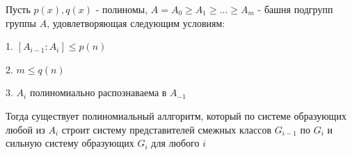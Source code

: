 \begin{theorem}
    Пусть $p(x), q(x)$ - полиномы, $A = A_0 \geqslant A_1 \geqslant ... \geqslant A_m$ - башня подгрупп группы $A$, удовлетворяющая следующим условиям:

    1. $[A_{i-1}:A_i] \leqslant p(n)$

    2. $m \leqslant q(n)$ 

    3. $A_i$ полиномиально распознаваема в $A_{-1}$

    Тогда существует полиномиальный аллгоритм, который по системе образующих любой из $A_i$ строит систему представителей смежных классов $G_{i-1}$ по $G_i$ и сильную систему образующих $G_i$ для любого $i$
\end{theorem}


